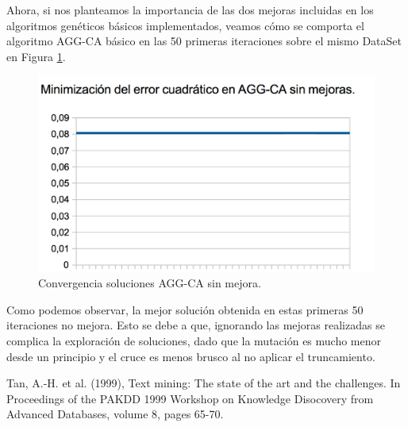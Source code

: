 \documentclass{article}
\begin{document}
	Ahora, si nos planteamos la importancia de las dos mejoras incluidas en los algoritmos genéticos básicos implementados, veamos cómo se comporta el algoritmo AGG-CA básico en las 50 primeras iteraciones sobre el mismo DataSet en Figura \ref{fig:aggcano}. 
	
	
	\begin{figure}[H]
		\centering
		\includegraphics[width=0.7\linewidth]{aggca-nomejora}
		\caption{Convergencia soluciones AGG-CA sin mejora.}
		\label{fig:aggcano}
	\end{figure}

	Como podemos observar, la mejor solución obtenida en estas primeras 50 iteraciones no mejora. Esto se debe a que, ignorando las mejoras realizadas se complica la exploración de soluciones, dado que la mutación es mucho menor desde un principio y el cruce es menos brusco al no aplicar el truncamiento. 
	

\begin{thebibliography}{99}
 \hspace{-.22cm} Tan, A.-H. et al. (1999), Text mining: The state of the art and
	the challenges. In Proceedings of the PAKDD 1999 Workshop on Knowledge
	Disocovery from Advanced Databases, volume 8, pages 65-70.
\end{thebibliography}
\end{document}
